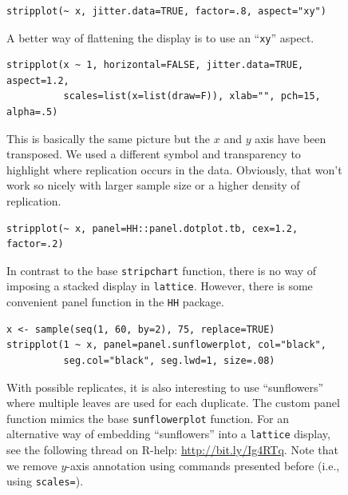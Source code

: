 \documentclass[a4paper,twoside]{book}
\newcounter{fig}
\newcommand{\img}[1]{\texttt{[image: \#1]}\stepcounter{fig}}
\renewcommand{\texttt}[1]{\lstinline{#1}}
\begin{document}
\begin{figure}[H]
\begin{lstlisting}
stripplot(~ x, jitter.data=TRUE, factor=.8, aspect="xy")
\end{lstlisting}
  \fcapside[\FBwidth] {\img{figs_lattice-crop}}
  {\caption*{A better way of flattening the display is to use an
      ``\texttt{xy}'' aspect.}}
\end{figure}

\begin{figure}[H]
\begin{lstlisting}
stripplot(x ~ 1, horizontal=FALSE, jitter.data=TRUE, aspect=1.2,
          scales=list(x=list(draw=F)), xlab="", pch=15, alpha=.5)
\end{lstlisting}
  \fcapside[\FBwidth] {\img{figs_lattice-crop}}
  {\caption*{This is basically the same picture but the $x$ and $y$
      axis have been transposed. We used a different symbol and
      transparency to highlight where replication occurs in the
      data. Obviously, that won't work so nicely with larger sample
      size or a higher density of replication.}}
\end{figure}

\begin{figure}[H]
\begin{lstlisting}
stripplot(~ x, panel=HH::panel.dotplot.tb, cex=1.2, factor=.2)
\end{lstlisting}
  \fcapside[\FBwidth] {\img{figs_lattice-crop}} {\caption*{In contrast
      to the base \texttt{stripchart} function, there is no way of
      imposing a stacked display in \texttt{lattice}. However, there
      is some convenient panel function in the \texttt{HH} package.}}
\end{figure}

\begin{figure}[H]
\begin{lstlisting}
x <- sample(seq(1, 60, by=2), 75, replace=TRUE)
stripplot(1 ~ x, panel=panel.sunflowerplot, col="black", 
          seg.col="black", seg.lwd=1, size=.08)
\end{lstlisting}
  \fcapside[\FBwidth] {\img{figs_lattice-crop}} {\caption*{With
      possible replicates, it is also interesting to use
      ``sunflowers'' where multiple leaves are used for each
      duplicate. The custom panel function mimics the base
      \texttt{sunflowerplot} function. For an alternative way of
      embedding ``sunflowers'' into a \texttt{lattice} display, see
      the following thread on R-help: \url{http://bit.ly/Ig4RTq}. Note
      that we remove $y$-axis annotation using commands presented
      before (i.e., using \texttt{scales=}).}}
\end{figure}
\end{document}
